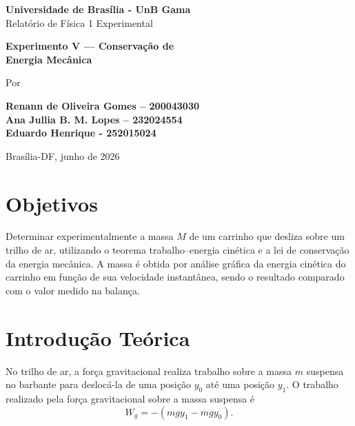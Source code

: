 \documentclass[12pt,a4paper]{article}
\begin{document}
\begin{titlepage}

\begin{center}

\large{\textbf{Universidade de Brasília - UnB Gama}}\\[1cm]



{\large Relatório de Física 1 Experimental}

\vspace{2.3cm}
{\large }
\vspace{2.6cm}



{\LARGE \bf  Experimento V --- Conservação de\\ Energia Mecânica} \vspace{2cm}

Por
%
\vspace{2cm}

{\bf	Renann de Oliveira Gomes – 200043030 \\
		Ana Jullia B. M. Lopes – 232024554 \\
		Eduardo Henrique - 252015024 \\}



%
\vspace*{\fill}

%
{Brasília-DF, junho de 2026}


\end{center}
\end{titlepage}




\newpage


\section{Objetivos}
Determinar experimentalmente a massa $M$ de um carrinho que desliza sobre um trilho de ar,
utilizando o teorema trabalho--energia cinética e a lei de conservação da energia mecânica.
A massa é obtida por análise gráfica da energia cinética do carrinho em função de sua velocidade
instantânea, sendo o resultado comparado com o valor medido na balança.



\section{Introdução Teórica}
No trilho de ar, a força gravitacional realiza trabalho sobre a massa $m$ suspensa no barbante
para deslocá-la de uma posição $y_0$ até uma posição $y_1$. O trabalho realizado pela força
gravitacional sobre a massa suspensa é
\begin{equation}
\label{eq:Wg}
W_g = -\left(mgy_1 - mgy_0\right).
\end{equation}
\end{document}
